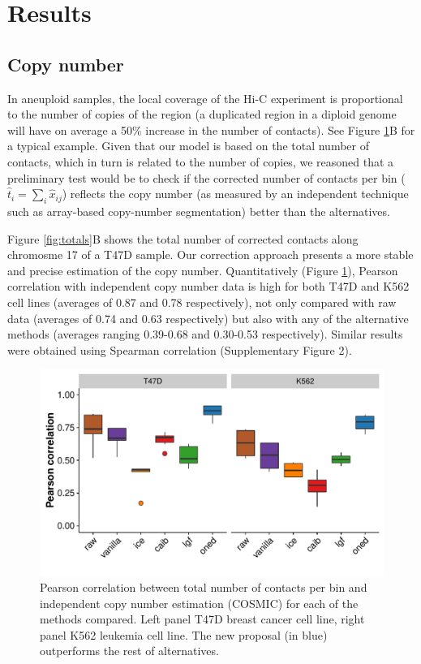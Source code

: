 \documentclass{bioinfo}
\begin{document}
\section{Results}

\subsection{Copy number}

In aneuploid samples, the local coverage of the Hi-C experiment is
proportional to the number of copies of the region (a duplicated region in
a diploid genome will have on average a 50\% increase in the number of
contacts). See Figure \ref{fig:copy_number}B for a typical example.
Given that our model is based on the total number of contacts, which in
turn is related to the number of copies, we reasoned that a
preliminary test would be to check if the corrected number of contacts per
bin ($\hat{t}_i = \sum_{i}{\hat{x}_{ij}}$) reflects the copy number (as
measured by an independent technique such as array-based copy-number
segmentation) better than the alternatives.


Figure \ref{fig:totals}B shows the total number of corrected contacts
along chromosme 17 of a T47D sample. Our correction approach presents a
more stable and precise estimation of the copy number. Quantitatively
(Figure \ref{fig:copy_number}), Pearson correlation with independent copy
number data is high for both T47D and K562 cell lines (averages of 0.87
and 0.78 respectively), not only compared with raw data (averages of 0.74
and 0.63 respectively) but also with any of the alternative methods
(averages ranging 0.39-0.68 and 0.30-0.53 respectively). Similar results
were obtained using Spearman correlation (Supplementary Figure 2).


\begin{figure}
	\centerline{\includegraphics[width=.45\textwidth]
{img/copy_number_figure2.pdf}}
	\caption{
    Pearson correlation between total number of contacts per bin and
independent copy number estimation (COSMIC) for each of the methods
compared. Left panel T47D breast cancer cell line, right panel K562
leukemia cell line. The new proposal (in blue) outperforms the rest of
alternatives.  }\label{fig:copy_number}
\end{figure}
\end{document}
